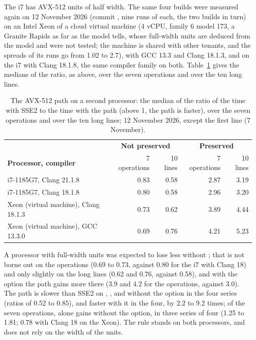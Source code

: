 The i7 has AVX-512 units of half width. The same four builds were measured
again on 12 November 2026 (commit , nine runs of each, the two
builds in turn) on an Intel Xeon of a cloud virtual machine (4 vCPU, family 6
model 173, a Granite Rapids as far as the model tells, whose full-width units
are deduced from the model and were not tested; the machine is shared with
other tenants, and the spreads of its runs go from 1.02 to 2.7), with GCC 13.3 and Clang 18.1.3, and on the i7 with Clang 18.1.8, the same compiler family on both. Table~\ref{tab:computing-avx512-xeon} gives the medians of the ratio,
as above, over the seven operations and over the ten long lines.

\begin{table}[htbp]
\centering\footnotesize
\caption[The AVX-512 path on a second processor]{The AVX-512 path on a second processor: the median of the ratio of the time with SSE2 to the time with the path (above 1, the path is faster), over the seven operations and over the ten long lines; 12 November 2026, except the first line (7 November).} \label{tab:computing-avx512-xeon}
\begin{tabular}{|l|r|r|r|r|}
\hline
& \multicolumn{2}{c|}{\textbf{Not preserved}}
& \multicolumn{2}{c|}{\textbf{Preserved}} \\
\textbf{Processor, compiler} & 7 operations & 10 lines & 7 operations & 10 lines \\
\hline
i7-1185G7, Clang 21.1.8 & 0.83 & 0.58 & 2.87 & 3.19 \\
i7-1185G7, Clang 18.1.8 & 0.80 & 0.58 & 2.96 & 3.20 \\
Xeon (virtual machine), Clang 18.1.3 & 0.73 & 0.62 & 3.89 & 4.44 \\
Xeon (virtual machine), GCC 13.3.0 & 0.69 & 0.76 & 4.21 & 5.23 \\
\hline
\end{tabular}

\end{table}

A processor with full-width units was expected to lose less without
; that is not borne out on the operations (0.69 to 0.73, against 0.80 for the i7 with Clang 18) and only slightly on the long lines (0.62 and 0.76, against 0.58), and with the option the path gains more there (3.9 and 4.2 for the operations, against 3.0). The path is slower than SSE2
on \code{+}, \code{-}, \code{*} and \code{/} without the option in the four
series (ratios of 0.52 to 0.85), and faster with it in the four, by 2.2 to
9.2 times; of the seven operations,  alone gains without the
option, in three series of four (1.25 to 1.81; 0.78 with Clang 18 on the
Xeon). The rule stands on both processors, and does not rely on the width of
the units.

